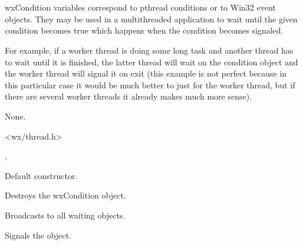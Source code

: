 \section{}\label{wxcondition}

wxCondition variables correspond to pthread conditions or to Win32 event
objects. They may be used in a multithreaded application to wait until the
given condition becomes true which happens when the condition becomes signaled.

For example, if a worker thread is doing some long task and another thread has
to wait until it is finished, the latter thread will wait on the condition
object and the worker thread will signal it on exit (this example is not
perfect because in this particular case it would be much better to just 
 for the worker thread, but if there are several
worker threads it already makes much more sense).


None.


<wx/thread.h>


, 


\label{wxconditionconstr}


Default constructor.



Destroys the wxCondition object.

\label{wxconditionbroadcast}


Broadcasts to all waiting objects.

\label{wxconditionsignal}


Signals the object.

\label{wxconditionwait}


